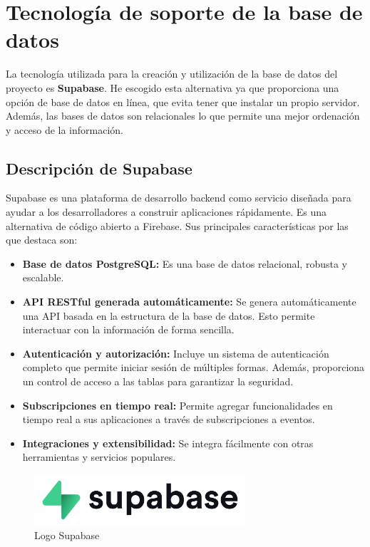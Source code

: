 \section{Tecnología de soporte de la base de datos}

La tecnología utilizada para la creación y utilización de la base de datos del proyecto es \textbf{Supabase}. He escogido esta alternativa ya que proporciona una opción de base de datos en línea, que evita tener que instalar un propio servidor. Además, las bases de datos son relacionales lo que permite una mejor ordenación y acceso de la información. 

\subsection{Descripción de Supabase}

Supabase es una plataforma de desarrollo backend como servicio diseñada para ayudar a los desarrolladores a construir aplicaciones rápidamente. Es una alternativa de código abierto a Firebase. Sus principales características por las que destaca son: \cite{supabase}

\begin{itemize}
	\item \textbf{Base de datos PostgreSQL: } Es una base de datos relacional, robusta y escalable. 
	\item \textbf{API RESTful generada automáticamente: } Se genera automáticamente una API basada en la estructura de la base de datos. Esto permite interactuar con la información de forma sencilla. 
	\item \textbf{Autenticación y autorización: } Incluye un sistema de autenticación completo que permite iniciar sesión de múltiples formas. Además, proporciona un control de acceso a las tablas para garantizar la seguridad. 
	\item \textbf{Subscripciones en tiempo real: } Permite agregar funcionalidades en tiempo real a sus aplicaciones a través de subscripciones a eventos. 
	\item \textbf{Integraciones y extensibilidad: } Se integra fácilmente con otras herramientas y servicios populares. 
\end{itemize}

\begin{figure}[H]
	\centering
	\includegraphics[width=0.7\textwidth]{imagenes/imagenesTecnologias/supabase.jpg}
	\caption{Logo Supabase}
\end{figure}

